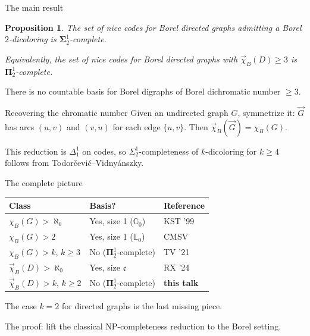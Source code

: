 \documentclass[aspectratio=169, 12pt]{beamer}
\newtheorem{proposition}[theorem]{Proposition}
\newcommand{\vchi}{\vec{\chi}_B}
\begin{document}
\begin{frame}{The main result}
\begin{proposition}
The set of nice codes for Borel directed graphs admitting a Borel $2$-dicoloring is $\mathbf\Sigma^1_2$-complete.

Equivalently, the set of nice codes for Borel directed graphs with $\vchi(D) \geq 3$ is $\mathbf\Pi^1_2$-complete.
\end{proposition}

\pause

\begin{corollary}
There is no countable basis for Borel digraphs of Borel dichromatic number $\geq 3$.
\end{corollary}

\pause

\begin{block}{Recovering the chromatic number}
Given an undirected graph $G$, symmetrize it: $\vec{G}$ has arcs $(u,v)$ and $(v,u)$ for each edge $\{u,v\}$. Then $\vchi(\vec{G}) = \chi_B(G)$.

This reduction is $\Delta^1_1$ on codes, so $\Sigma^1_2$-completeness of $k$-dicoloring for $k \geq 4$ follows from Todorčević--Vidnyánszky.
\end{block}
\end{frame}

\begin{frame}{The complete picture}
\begin{center}
\renewcommand{\arraystretch}{1.3}
\begin{tabular}{lll}
	\hline
	\textbf{Class} & \textbf{Basis?} & \textbf{Reference} \\
	\hline
	$\chi_B(G) > \aleph_0$ & Yes, size 1 ($\mathbb{G}_0$) & KST '99 \\
	$\chi_B(G) > 2$ & Yes, size 1 ($\mathbb{L}_0$) & CMSV \\
	$\chi_B(G) > k$, $k\geq 3$ & \alert{No} ($\mathbf\Pi^1_2$-complete) & TV '21 \\
	\hline
	$\vchi(D) > \aleph_0$ & Yes, size $\mathfrak{c}$ & RX '24 \\
	$\vchi(D) > k$, $k\geq 2$ & \alert{No} ($\mathbf\Pi^1_2$-complete) & \textbf{this talk} \\
	\hline
\end{tabular}
\end{center}

\pause
\medskip

The case $k=2$ for directed graphs is the \alert{last missing piece}.

\medskip

The proof: lift the classical NP-completeness reduction to the Borel setting.
\end{frame}
\end{document}
